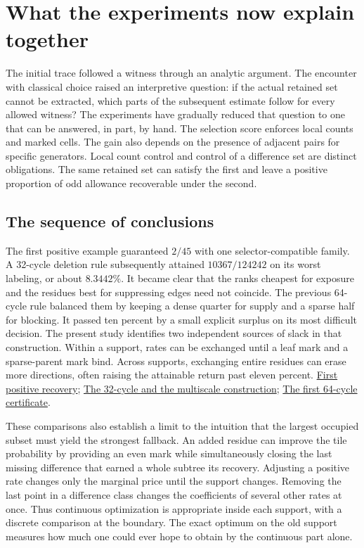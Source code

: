 \section{What the experiments now explain together}
\label{sec:synthesis}
The initial trace followed a witness through an analytic argument. The encounter with classical choice raised an interpretive question: if the actual retained set cannot be extracted, which parts of the subsequent estimate follow for every allowed witness? The experiments have gradually reduced that question to one that can be answered, in part, by hand. The selection score enforces local counts and marked cells. The gain also depends on the presence of adjacent pairs for specific generators. Local count control and control of a difference set are distinct obligations. The same retained set can satisfy the first and leave a positive proportion of odd allowance recoverable under the second.

\subsection{The sequence of conclusions}
The first positive example guaranteed \(2/45\) with one selector-compatible family. A 32-cycle deletion rule subsequently attained \(10367/124242\) on its worst labeling, or about \(8.3442\%\). It became clear that the ranks cheapest for exposure and the residues best for suppressing edges need not coincide. The previous 64-cycle rule balanced them by keeping a dense quarter for supply and a sparse half for blocking. It passed ten percent by a small explicit surplus on its most difficult decision. The present study identifies two independent sources of slack in that construction. Within a support, rates can be exchanged until a leaf mark and a sparse-parent mark bind. Across supports, exchanging entire residues can erase more directions, often raising the attainable return past eleven percent. \href{https://github.com/nousentllc/riemann-hypothesis/pull/12}{First positive recovery}; \href{https://github.com/nousentllc/riemann-hypothesis/pull/13}{The 32-cycle and the multiscale construction}; \href{https://github.com/nousentllc/riemann-hypothesis/pull/14}{The first 64-cycle certificate}.

These comparisons also establish a limit to the intuition that the largest occupied subset must yield the strongest fallback. An added residue can improve the tile probability by providing an even mark while simultaneously closing the last missing difference that earned a whole subtree its recovery. Adjusting a positive rate changes only the marginal price until the support changes. Removing the last point in a difference class changes the coefficients of several other rates at once. Thus continuous optimization is appropriate inside each support, with a discrete comparison at the boundary. The exact optimum on the old support measures how much one could ever hope to obtain by the continuous part alone.


